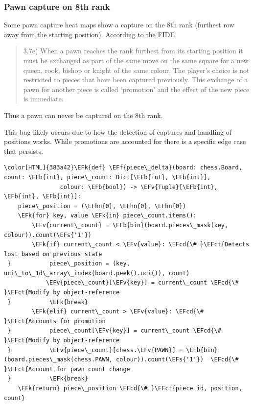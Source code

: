 \documentclass[11pt]{article}
\newcommand{\EFk}[1]{\textcolor{EFk}{#1}} %
\newcommand{\EFs}[1]{\textcolor{EFs}{#1}} %
\newcommand{\EFb}[1]{\textcolor{EFb}{#1}} %
\newcommand{\EFct}[1]{\textcolor{EFct}{#1}} %
\newcommand{\EFv}[1]{\textcolor{EFv}{#1}} %
\newcommand{\EFf}[1]{\textcolor{EFf}{#1}} %
\newcommand{\EFcd}[1]{\textcolor{EFcd}{#1}} %
\newcommand{\EFhn}[1]{\textcolor{EFhn}{\textbf{#1}}} %
\begin{document}
\subsubsection{Pawn capture on 8th rank}
\label{sec:org8c1d1fd}
Some pawn capture heat maps show a capture on the 8th rank (furthest row away from the starting position). According to the FIDE
\begin{quote}
3.7e) When  a  pawn  reaches  the  rank  furthest  from  its  starting  position  it  must  be  exchanged  as  part  of  the  same  move  on  the  same  square  for  a  new queen,  rook,  bishop  or  knight  of  the  same  colour.  The  player’s  choice  is  not  restricted  to  pieces  that  have  been  captured  previously.  This  exchange  of  a  pawn  for  another  piece  is  called ‘promotion’ and the effect of the new piece is immediate.
\cite{FIDE}
\end{quote}
Thus a pawn can never be captured on the 8th rank.

This bug likely occurs due to how the detection of captures and handling of positions works. While promotions are accounted for there is a specific edge case that persists.

\begin{Code}
\begin{Verbatim}[]
\color[HTML]{383a42}\EFk{def} \EFf{piece\_delta}(board: chess.Board, count: \EFb{int}, piece\_count: Dict[\EFb{int}, \EFb{int}],
                colour: \EFb{bool}) -> \EFv{Tuple}[\EFb{int}, \EFb{int}, \EFb{int}]:
    piece\_position = (\EFhn{0}, \EFhn{0}, \EFhn{0})
    \EFk{for} key, value \EFk{in} piece\_count.items():
        \EFv{current\_count} = \EFb{bin}(board.pieces\_mask(key, colour)).count(\EFs{'1'})
        \EFk{if} current\_count < \EFv{value}: \EFcd{\# }\EFct{Detects lost based on previous state
 }           piece\_position = (key, uci\_to\_1d\_array\_index(board.peek().uci()), count)
            \EFv{piece\_count}[\EFv{key}] = current\_count \EFcd{\# }\EFct{Modify by object-reference
 }           \EFk{break}
        \EFk{elif} current\_count > \EFv{value}: \EFcd{\# }\EFct{Accounts for promotion
 }           piece\_count[\EFv{key}] = current\_count \EFcd{\# }\EFct{Modify by object-reference
 }           \EFv{piece\_count}[chess.\EFv{PAWN}] = \EFb{bin}(board.pieces\_mask(chess.PAWN, colour)).count(\EFs{'1'})  \EFcd{\# }\EFct{Account for pawn count change
 }           \EFk{break}
    \EFk{return} piece\_position \EFcd{\# }\EFct{piece id, position, count}
\end{Verbatim}
\end{Code}
\end{document}
